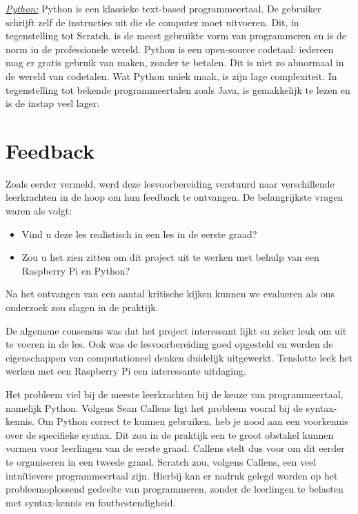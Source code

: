 \emph{\underline{Python:}}
Python is een klassieke text-based programmeertaal. De gebruiker schrijft zelf de instructies uit die de computer moet uitvoeren. Dit, in tegenstelling tot Scratch, is de meest gebruikte vorm van programmeren en is de norm in de professionele wereld. Python is een open-source codetaal: iedereen mag er gratis gebruik van maken, zonder te betalen.
Dit is niet zo abnormaal in de wereld van codetalen. Wat Python uniek maak, is zijn lage complexiteit. In tegenstelling tot bekende programmeertalen zoals Java, is gemakkelijk te lezen en is de instap veel lager.


\section{Feedback}
Zoals eerder vermeld, werd deze lesvoorbereiding verstuurd naar verschillende leerkrachten in de hoop om hun feedback te ontvangen.
De belangrijkste vragen waren als volgt:
\begin{itemize}
    \item Vind u deze les realistisch in een les in de eerste graad?
    \item Zou u het zien zitten om dit project uit te werken met behulp van een Raspberry Pi en Python?
\end{itemize}
Na het ontvangen van een aantal kritische kijken kunnen we evalueren als ons onderzoek zou slagen in de praktijk. 

De algemene consensus was dat het project interessant lijkt en zeker leuk om uit te voeren in de les. Ook was de lesvoorbereiding goed opgesteld en werden de eigenschappen van computationeel denken duidelijk uitgewerkt. Tenslotte leek het werken met een Raspberry Pi een interessante uitdaging. 

Het probleem viel bij de meeste leerkrachten bij de keuze van programmeertaal, namelijk Python.
Volgens Sean Callens ligt het probleem vooral bij de syntax-kennis. Om Python correct te kunnen gebruiken, heb je nood aan een voorkennis over de specifieke syntax. Dit zou in de praktijk een te groot obstakel kunnen vormen voor leerlingen van de eerste graad. Callens stelt dus voor om dit eerder te organiseren in een tweede graad. Scratch zou, volgens Callens, een veel intuïtievere programmeertaal zijn. Hierbij kan er nadruk gelegd worden op het probleemoplossend gedeelte van programmeren, zonder de leerlingen te belasten met syntax-kennis en foutbestendigheid. 